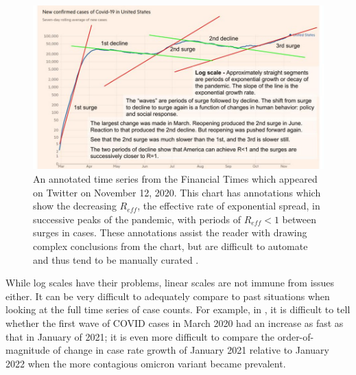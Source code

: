 \documentclass[article]{jdssv}\usepackage[]{graphicx}\usepackage[]{xcolor}
\begin{document}
\begin{figure}
\centering
\includegraphics[width=.8\linewidth]{ft-reference-lines}
\caption{An annotated time series from the Financial Times which appeared on Twitter on November 12, 2020. This chart has annotations which show the decreasing $R_{eff}$, the effective rate of exponential spread, in successive peaks of the pandemic, with periods of $R_{eff}<1$ between surges in cases. These annotations assist the reader with drawing complex conclusions from the chart, but are difficult to automate and thus tend to be manually curated \citep{gubrudDrEricDingWeVe2020}.}
\label{fig:log-scale-ref-multiple}
\end{figure}


While log scales have their problems, linear scales are not immune from issues either. It can be very difficult to adequately compare to past situations when looking at the full time series of case counts. For example, in , it is difficult to tell whether the first wave of COVID cases in March 2020 had an increase as fast as that in January of 2021; it is even more difficult to compare the order-of-magnitude of change in case rate growth of January 2021 relative to January 2022 when the more contagious omicron variant became prevalent. 
\end{document}
